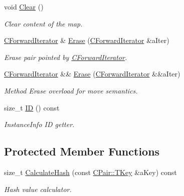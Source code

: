 \begin{DoxyCompactItemize}
void \hyperlink{class_c_hash_map_a5fa63d790d41e91a0c61d63e813356af}{Clear} ()
\begin{DoxyCompactList}\small\item\em Clear content of the map. \end{DoxyCompactList}\item 
\hyperlink{class_c_hash_map_1_1_c_forward_iterator}{C\+Forward\+Iterator} \& \hyperlink{class_c_hash_map_a644b7450021eb6f1a7d2b03f7dbe1832}{Erase} (\hyperlink{class_c_hash_map_1_1_c_forward_iterator}{C\+Forward\+Iterator} \&a\+Iter)
\begin{DoxyCompactList}\small\item\em Erase pair pointed by \hyperlink{class_c_hash_map_1_1_c_forward_iterator}{C\+Forward\+Iterator}. \end{DoxyCompactList}\item 
\hyperlink{class_c_hash_map_1_1_c_forward_iterator}{C\+Forward\+Iterator} \&\& \hyperlink{class_c_hash_map_a82b22ccd322c826a368101e6451c5153}{Erase} (\hyperlink{class_c_hash_map_1_1_c_forward_iterator}{C\+Forward\+Iterator} \&\&a\+Iter)
\begin{DoxyCompactList}\small\item\em Method Erase overload for move semantics. \end{DoxyCompactList}\item 
size\+\_\+t \hyperlink{class_c_hash_map_a9db788f13512583b22ed7b75fd76a9de}{ID} () const
\begin{DoxyCompactList}\small\item\em Instance\+Info ID getter. \end{DoxyCompactList}\end{DoxyCompactItemize}
\subsection*{Protected Member Functions}
\begin{DoxyCompactItemize}
\item 
size\+\_\+t \hyperlink{class_c_hash_map_ad7230ba064063608b7e49495d3660426}{Calculate\+Hash} (const \hyperlink{class_c_pair_a9030f3ef2a07301c105bdf17620ae66a}{C\+Pair\+::\+T\+Key} \&a\+Key) const
\begin{DoxyCompactList}\small\item\em Hash value calculator. \end{DoxyCompactList}\end{DoxyCompactItemize}
